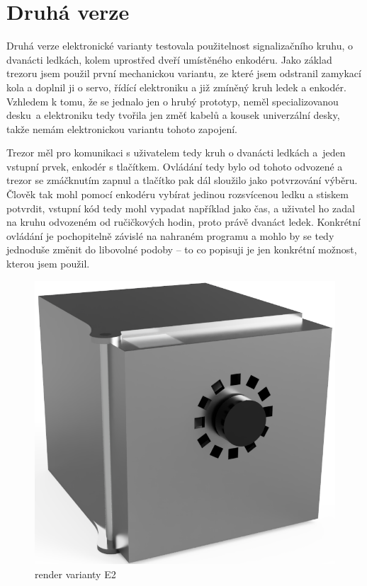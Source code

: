 \section{Druhá verze}


Druhá verze elektronické varianty testovala použitelnost signalizačního kruhu, o dvanácti ledkách, kolem uprostřed dveří
umístěného enkodéru. Jako základ trezoru jsem použil první mechanickou variantu, ze které jsem odstranil zamykací kola 
a doplnil ji o servo, řídící elektroniku a již zmíněný kruh ledek a enkodér.
Vzhledem k tomu, že se jednalo jen o hrubý prototyp, neměl specializovanou desku~a elektroniku  tedy tvořila jen změť kabelů 
a kousek univerzální desky, takže nemám elektronickou variantu tohoto zapojení. %

Trezor měl pro komunikaci s uživatelem tedy kruh o dvanácti ledkách a~jeden vstupní prvek, enkodér s tlačítkem.
Ovládání tedy bylo od tohoto odvozené a trezor se zmáčknutím zapnul a tlačítko pak dál sloužilo jako potvrzování výběru.
Člověk tak mohl pomocí enkodéru vybírat jedinou rozsvícenou ledku a stiskem potvrdit, vstupní kód tedy mohl vypadat 
například jako čas, a uživatel ho zadal na kruhu odvozeném od ručičkových hodin, proto právě dvanáct ledek.
Konkrétní ovládání je pochopitelně závislé na nahraném programu a mohlo by se tedy jednoduše změnit do libovolné podoby --
to co popisuji je jen konkrétní možnost, kterou jsem použil.

\begin{figure}[htbp]
    \centering
    \includegraphics[width=\textwidth]{kapitoly/obrazky/E2/predni_render.png}
    \caption{render varianty E2}
    \label{fig:E2-render}
\end{figure}

\newpage